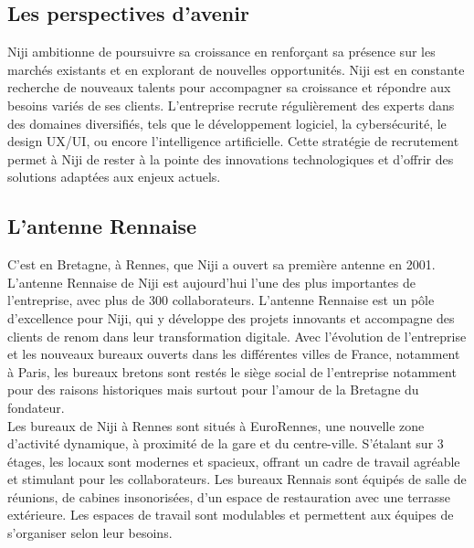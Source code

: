 \documentclass[12pt]{article}
\begin{document}
\subsection{Les perspectives d'avenir}
Niji ambitionne de poursuivre sa croissance en renforçant sa présence sur les marchés existants et en explorant de nouvelles opportunités.
Niji est en constante recherche de nouveaux talents pour accompagner sa croissance et répondre aux besoins variés de ses clients. L'entreprise recrute régulièrement des experts dans des domaines diversifiés, tels que le développement logiciel, la cybersécurité, le design UX/UI, ou encore l'intelligence artificielle. Cette stratégie de recrutement permet à Niji de rester à la pointe des innovations technologiques et d'offrir des solutions adaptées aux enjeux actuels.

\subsection{L'antenne Rennaise}
C'est en Bretagne, à Rennes, que Niji a ouvert sa première antenne en 2001. L'antenne Rennaise de Niji est aujourd'hui l'une des plus importantes de l'entreprise, avec plus de 300 collaborateurs. L'antenne Rennaise est un pôle d'excellence pour Niji, qui y développe des projets innovants et accompagne des clients de renom dans leur transformation digitale. Avec l'évolution de l'entreprise et les nouveaux bureaux ouverts dans les différentes villes de France, notamment à Paris, les bureaux bretons sont restés le siège social de l'entreprise notamment pour des raisons historiques mais surtout pour l'amour de la Bretagne du fondateur.
\\
Les bureaux de Niji à Rennes sont situés à EuroRennes, une nouvelle zone d'activité dynamique, à proximité de la gare et du centre-ville. S'étalant sur 3 étages, les locaux sont modernes et spacieux, offrant un cadre de travail agréable et stimulant pour les collaborateurs. Les bureaux Rennais sont équipés de salle de réunions, de cabines insonorisées, d'un espace de restauration avec une terrasse extérieure. Les espaces de travail sont modulables et permettent aux équipes de s'organiser selon leur besoins. 
\end{document}
